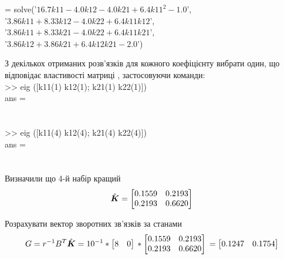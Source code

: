 \documentclass[a4paper]{article}
\begin{document}
\begin{center}
\hfill \break
\big[ k11, k12, k21, k22 \big] = solve('$16.7k11 - 4.0k12 - 4.0k21 + 6.4k11^2 - 1.0$', \\
'$3.86k11 + 8.33k12 - 4.0k22 + 6.4k11k12$',\\
'$3.86k11 + 8.33k21 - 4.0k22 + 6.4k11k21$',\\
'$3.86k12 + 3.86k21 + 6.4k12k21 - 2.0$')\\
\end{center}
\hfill \break
\indent З декількох отриманих розв’язків для кожного коефіцієнту вибрати
один, що відповідає властивості матриці , застосовуючи команди:\\
\hfill \break
\indent >> eig ([k11(1) k12(1); k21(1) k22(1)]) \\
\indent ans = \\
 \\
 \\
\indent >> eig ([k11(4) k12(4); k21(4) k22(4)]) \\
\indent ans = \\
 \\
 \\
\hfill \break
\indent Визначили що 4-й набір кращий
\[
\hat{\boldsymbol{K}} =
\begin{bmatrix}
    0.1559 & 0.2193\\
    0.2193 & 0.6620 \\
\end{bmatrix}\\
\]


\hfill \break
\indent Розрахувати вектор зворотних зв’язків за станами\\

\[
G = r^{-1}B^{T}\hat{\boldsymbol{K}} =
10^{-1} *
\begin{bmatrix}
    8 & 0
\end{bmatrix}\\ *
\begin{bmatrix}
    0.1559 & 0.2193\\
    0.2193 & 0.6620 \\
\end{bmatrix}\\ =
\begin{bmatrix}
    0.1247 & 0.1754\\
\end{bmatrix}\\
\]
\end{document}
